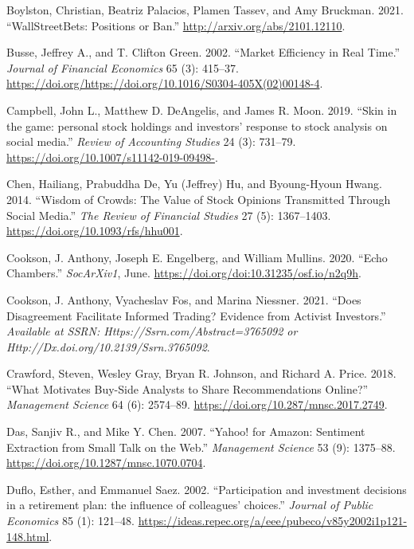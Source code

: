 \documentclass[12pt,]{article}
\begin{document}
\leavevmode\hypertarget{ref-boylston2021}{}%
Boylston, Christian, Beatriz Palacios, Plamen Tassev, and Amy Bruckman.
2021. ``WallStreetBets: Positions or Ban.''
\url{http://arxiv.org/abs/2101.12110}.

\leavevmode\hypertarget{ref-busse2002}{}%
Busse, Jeffrey A., and T. Clifton Green. 2002. ``Market Efficiency in
Real Time.'' \emph{Journal of Financial Economics} 65 (3): 415--37.
\url{https://doi.org/https://doi.org/10.1016/S0304-405X(02)00148-4}.

\leavevmode\hypertarget{ref-campbell2019}{}%
Campbell, John L., Matthew D. DeAngelis, and James R. Moon. 2019. ``Skin
in the game: personal stock holdings and investors' response to stock
analysis on social media.'' \emph{Review of Accounting Studies} 24 (3):
731--79. \url{https://doi.org/10.1007/s11142-019-09498-}.

\leavevmode\hypertarget{ref-chen2014}{}%
Chen, Hailiang, Prabuddha De, Yu (Jeffrey) Hu, and Byoung-Hyoun Hwang.
2014. ``Wisdom of Crowds: The Value of Stock Opinions Transmitted
Through Social Media.'' \emph{The Review of Financial Studies} 27 (5):
1367--1403. \url{https://doi.org/10.1093/rfs/hhu001}.

\leavevmode\hypertarget{ref-cookson2020}{}%
Cookson, J. Anthony, Joseph E. Engelberg, and William Mullins. 2020.
``Echo Chambers.'' \emph{SocArXiv1}, June.
\url{https://doi.org/doi:10.31235/osf.io/n2q9h}.

\leavevmode\hypertarget{ref-cookson2021}{}%
Cookson, J. Anthony, Vyacheslav Fos, and Marina Niessner. 2021. ``Does
Disagreement Facilitate Informed Trading? Evidence from Activist
Investors.'' \emph{Available at SSRN: Https://Ssrn.com/Abstract=3765092
or Http://Dx.doi.org/10.2139/Ssrn.3765092}.

\leavevmode\hypertarget{ref-crawford2018}{}%
Crawford, Steven, Wesley Gray, Bryan R. Johnson, and Richard A. Price.
2018. ``What Motivates Buy-Side Analysts to Share Recommendations
Online?'' \emph{Management Science} 64 (6): 2574--89.
\url{https://doi.org/10.287/mnsc.2017.2749}.

\leavevmode\hypertarget{ref-das2007}{}%
Das, Sanjiv R., and Mike Y. Chen. 2007. ``Yahoo! for Amazon: Sentiment
Extraction from Small Talk on the Web.'' \emph{Management Science} 53
(9): 1375--88. \url{https://doi.org/10.1287/mnsc.1070.0704}.

\leavevmode\hypertarget{ref-duflo2002}{}%
Duflo, Esther, and Emmanuel Saez. 2002. ``Participation and investment
decisions in a retirement plan: the influence of colleagues' choices.''
\emph{Journal of Public Economics} 85 (1): 121--48.
\url{https://ideas.repec.org/a/eee/pubeco/v85y2002i1p121-148.html}.
\end{document}
